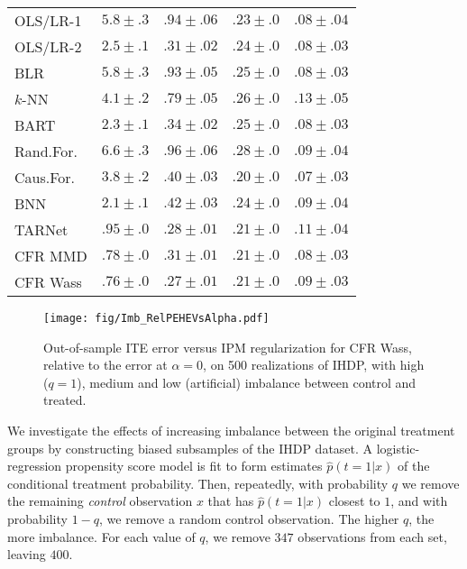 \documentclass{article}
\def\tarnet{{TARNet}}
\begin{document}
\begin{table}[t!]
\begin{center}
\begin{small}
\begin{sc}
\begin{tabular}{l|cc|cc}
        OLS/LR-1  & $5.8 \pm .3$ & $.94 \pm .06$ & $.23 \pm .0$ & $.08 \pm .04$ \\
        OLS/LR-2  & $2.5 \pm .1$ & $.31 \pm .02$ & $.24 \pm .0$ & $.08 \pm .03$ \\
        BLR  & $5.8 \pm .3$ & $.93 \pm .05$ & $.25 \pm  .0$ & $.08 \pm .03$ \\
        $k$-NN & $4.1 \pm .2$ & $.79 \pm .05$ & $.26 \pm .0$ & $.13 \pm .05$ \\
BART  & $2.3 \pm .1$ & $.34 \pm .02$ & $.25 \pm .0$ & $.08 \pm .03$ \\
        Rand.For.  & $6.6 \pm .3$ & $.96 \pm .06$ & $.28 \pm .0$ & $.09 \pm .04$ \\
        Caus.For.  & $3.8 \pm .2$ & $.40 \pm .03$ & $.20 \pm .0$ & $.07 \pm .03$ \\
BNN  & $2.1 \pm .1$ & $.42 \pm .03$ & $.24 \pm .0$ & $.09 \pm .04$ \\
\tarnet{}  & $.95 \pm .0$ & $.28 \pm .01$ & $.21 \pm .0$ & $.11 \pm .04$ \\
        CFR MMD & $.78 \pm .0$ & $.31 \pm .01$ & $.21 \pm .0$ & $.08 \pm .03$ \\
        CFR Wass & $.76 \pm .0$ & $.27 \pm .01$ & $.21 \pm .0$ &  $.09 \pm .03$ \\
        \hline
      \end{tabular}
    \end{sc}
    \end{small}
  \end{center}
  \vspace{-1em}
\end{table}

\begin{figure}[t]
  \centering
  \texttt{[image: fig/Imb\_RelPEHEVsAlpha.pdf]}\vspace{-1em}
  \caption{\label{fig:ihdp_rel_imb}Out-of-sample ITE error versus IPM regularization for CFR Wass, relative to the error at $\alpha=0$, on 500 realizations of IHDP, with high ($q=1$), medium and low (artificial) imbalance between control and treated.}
  \vspace{-1.2em}
\end{figure}

\vskip -5pt
We investigate the effects of increasing imbalance between the original treatment groups by constructing biased subsamples of the IHDP dataset. A logistic-regression propensity score model is fit to form estimates $\hat{p}(t=1|x)$ of the conditional treatment probability. Then, repeatedly, with probability $q$ we remove the remaining \emph{control} observation $x$ that has $\hat{p}(t=1|x)$ closest to $1$, and with probability $1-q$, we remove a random control observation. The higher $q$, the more imbalance. For each value of $q$, we remove $347$ observations from each set, leaving $400$.
\end{document}

